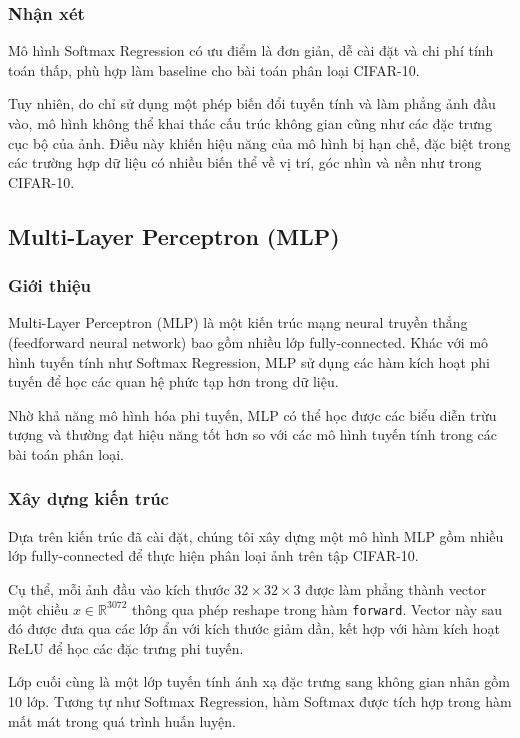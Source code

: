 \subsubsection{Nhận xét}

Mô hình Softmax Regression có ưu điểm là đơn giản, dễ cài đặt và chi phí tính toán thấp, phù hợp làm baseline cho bài toán phân loại CIFAR-10.

Tuy nhiên, do chỉ sử dụng một phép biến đổi tuyến tính và làm phẳng ảnh đầu vào, mô hình không thể khai thác cấu trúc không gian cũng như các đặc trưng cục bộ của ảnh. Điều này khiến hiệu năng của mô hình bị hạn chế, đặc biệt trong các trường hợp dữ liệu có nhiều biến thể về vị trí, góc nhìn và nền như trong CIFAR-10.

\subsection{Multi-Layer Perceptron (MLP)}

\subsubsection{Giới thiệu}

Multi-Layer Perceptron (MLP) là một kiến trúc mạng neural truyền thẳng (feedforward neural network) bao gồm nhiều lớp fully-connected. Khác với mô hình tuyến tính như Softmax Regression, MLP sử dụng các hàm kích hoạt phi tuyến để học các quan hệ phức tạp hơn trong dữ liệu.

Nhờ khả năng mô hình hóa phi tuyến, MLP có thể học được các biểu diễn trừu tượng và thường đạt hiệu năng tốt hơn so với các mô hình tuyến tính trong các bài toán phân loại.

\subsubsection{Xây dựng kiến trúc}

Dựa trên kiến trúc đã cài đặt, chúng tôi xây dựng một mô hình MLP gồm nhiều lớp fully-connected để thực hiện phân loại ảnh trên tập CIFAR-10.

Cụ thể, mỗi ảnh đầu vào kích thước $32 \times 32 \times 3$ được làm phẳng thành vector một chiều $x \in \mathbb{R}^{3072}$ thông qua phép reshape trong hàm \texttt{forward}. Vector này sau đó được đưa qua các lớp ẩn với kích thước giảm dần, kết hợp với hàm kích hoạt ReLU để học các đặc trưng phi tuyến.

Lớp cuối cùng là một lớp tuyến tính ánh xạ đặc trưng sang không gian nhãn gồm 10 lớp. Tương tự như Softmax Regression, hàm Softmax được tích hợp trong hàm mất mát trong quá trình huấn luyện.

